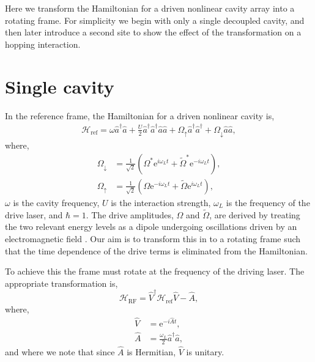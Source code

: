 Here we transform the Hamiltonian for a driven nonlinear cavity array into a rotating frame. For simplicity we begin with only a single decoupled cavity, and then later introduce a second site to show the effect of the transformation on a hopping interaction.

\section{Single cavity}

In the reference frame, the Hamiltonian for a driven nonlinear cavity is,
\begin{align}
	\mathcal{H}_{\mathrm{ref}} = \omega\hat{a}^{\dagger}\hat{a} + \frac{U}{2}\hat{a}^{\dagger}\hat{a}^{\dagger}\hat{a}\hat{a} + \Omega_{\uparrow}\hat{a}^{\dagger}\hat{a}^{\dagger} + \Omega_{\downarrow}\hat{a}\hat{a},
	\label{eq:rot1}
\end{align}
where, 
\begin{align}
	\Omega_{\downarrow} &= \frac{1}{\sqrt{2}} \left( \Omega^{*}\mathrm{e}^{i\omega_{L}t} + \tilde{\Omega}^{*}\mathrm{e}^{-i\omega_{L}t} \right), \label{eq:rot2} \\
	\Omega_{\uparrow} &= \frac{1}{\sqrt{2}} \left(\Omega\mathrm{e}^{-i\omega_{L}t} + \tilde{\Omega}\mathrm{e}^{i\omega_{L}t}\right), \label{eq:rot3}
\end{align}
\(\omega\) is the cavity frequency, \(U\) is the interaction strength, \(\omega_{L}\) is the frequency of the drive laser, and \(\hbar = 1\). The drive amplitudes, \(\Omega\) and \(\tilde{\Omega}\), are derived by treating the two relevant energy levels as a dipole undergoing oscillations driven by an electromagnetic field \cite{Fox_Omega}. Our aim is to transform this in to a rotating frame such that the time dependence of the drive terms is eliminated from the Hamiltonian. 

To achieve this the frame must rotate at the frequency of the driving laser. The appropriate transformation is,
\begin{equation}
	\mathcal{H}_{\mathrm{RF}} = \hat{V}^{\dagger}\mathcal{H}_{\mathrm{ref}}\hat{V} - \hat{A},
	\label{eq:rot4}
\end{equation}
where,
\begin{align}
	\hat{V} &= \mathrm{e}^{-i\hat{A}t}, \label{eq:rot5} \\
	\hat{A} &= \frac{\omega_{L}}{2} \hat{a}^{\dagger}\hat{a}, \label{eq:rot6}
\end{align}
and where we note that since \(\hat{A}\) is Hermitian, \(\hat{V}\) is unitary.

